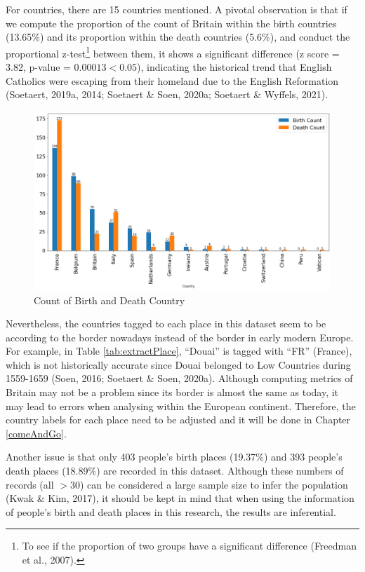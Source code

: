\documentclass[12pt,a4paper,oneside]{book}
\begin{document}
\begin{sloppypar}
For countries, there are 15 countries mentioned. A pivotal observation is that if we compute the proportion of the count of Britain within the birth countries (13.65\%) and its proportion within the death countries (5.6\%), and conduct the proportional z-test\footnote{To see if the proportion of two groups have a significant difference (Freedman et al., 2007).} between them, it shows a significant difference (z score = 3.82, p-value = $0.00013 < 0.05$), indicating the historical trend that English Catholics were escaping from their homeland due to the English Reformation (Soetaert, 2019a, 2014; Soetaert \& Soen, 2020a; Soetaert \& Wyffels, 2021).

\begin{figure}[H]
\centering
\includegraphics[scale=0.4]{graph/Count of Birth and Death Country.png}
\caption{Count of Birth and Death Country}
\label{fig:countCountry}
\end{figure}

\pagebreak
Nevertheless, the countries tagged to each place in this dataset seem to be according to the border nowadays instead of the border in early modern Europe. For example, in Table \ref{tab:extractPlace}, “Douai” is tagged with “FR” (France), which is not historically accurate since Douai belonged to Low Countries during 1559-1659 (Soen, 2016; Soetaert \& Soen, 2020a). Although computing metrics of Britain may not be a problem since its border is almost the same as today, it may lead to errors when analysing within the European continent. Therefore, the country labels for each place need to be adjusted and it will be done in Chapter \ref{comeAndGo}.

Another issue is that only 403 people’s birth places (19.37\%) and 393 people’s death places (18.89\%) are recorded in this dataset. Although these numbers of records (all $> 30$) can be considered a large sample size to infer the population (Kwak \& Kim, 2017), it should be kept in mind that when using the information of people’s birth and death places in this research, the results are inferential.


\end{sloppypar}
\end{document}
